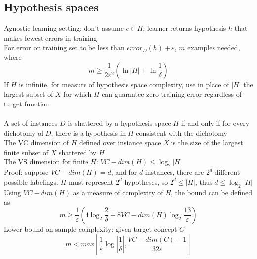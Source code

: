 \documentclass{article}
\begin{document}
		\subsection{Hypothesis spaces}
			Agnostic learning setting: don't assume $c \in H$, learner returns hypothesis $h$ that makes fewest errors in training \\
			For error on training set to be less than $error_D(h) + \varepsilon$, $m$ examples needed, where
			\begin{equation*}
				m \geq \frac{1}{2\varepsilon^2}\left(\ln{|H|} + \ln{\frac{1}{\delta}}\right)
				\end{equation*}
			If $H$ is infinite, for measure of hypothesis space complexity, use in place of $|H|$ the largest subset of $X$ for which $H$ can guarantee zero training error regardless of target function \\
			\\
			A set of instances $D$ is shattered by a hypothesis space $H$ if and only if for every dichotomy of $D$, there is a hypothesis in $H$ consistent with the dichotomy \\
			The VC dimension of $H$ defined over instance space $X$ is the size of the largest finite subset of $X$ shattered by $H$ \\
			The VS dimension for finite $H$: $VC-dim(H) \leq \log_2|H|$ \\
			Proof: suppose $VC-dim(H) = d$, and for $d$ instances, there are $2^d$ different possible labelings. $H$ must represent $2^d$ hypotheses, so $2^d \leq |H|$, thus $d \leq \log_2|H|$ \\
			Using $VC-dim(H)$ as a measure of complexity of $H$, the bound can be defined as
			\begin{equation*}
				m \geq \frac{1}{\varepsilon}\left(4\log_2\frac{2}{\delta} + 8VC-dim(H)\log_2\frac{13}{\varepsilon}\right)
				\end{equation*}
			Lower bound on sample complexity: given target concept $C$
			\begin{equation*}
				m < max\left[\frac{1}{\varepsilon}\log{|\frac{1}{\delta}|},  \frac{VC-dim(C) - 1}{32\varepsilon}\right]
				\end{equation*}
\end{document}
